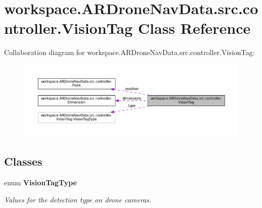 \hypertarget{classworkspace_1_1_a_r_drone_nav_data_1_1src_1_1controller_1_1_vision_tag}{}\section{workspace.\+A\+R\+Drone\+Nav\+Data.\+src.\+controller.\+Vision\+Tag Class Reference}
\label{classworkspace_1_1_a_r_drone_nav_data_1_1src_1_1controller_1_1_vision_tag}


Collaboration diagram for workspace.\+A\+R\+Drone\+Nav\+Data.\+src.\+controller.\+Vision\+Tag\+:
\nopagebreak
\begin{figure}[H]
\begin{center}
\leavevmode
\includegraphics[width=350pt]{classworkspace_1_1_a_r_drone_nav_data_1_1src_1_1controller_1_1_vision_tag__coll__graph}
\end{center}
\end{figure}
\subsection*{Classes}
\begin{DoxyCompactItemize}
\item 
enum {\bfseries Vision\+Tag\+Type}
\begin{DoxyCompactList}\small\item\em Values for the detection type on drone cameras. \end{DoxyCompactList}\end{DoxyCompactItemize}
